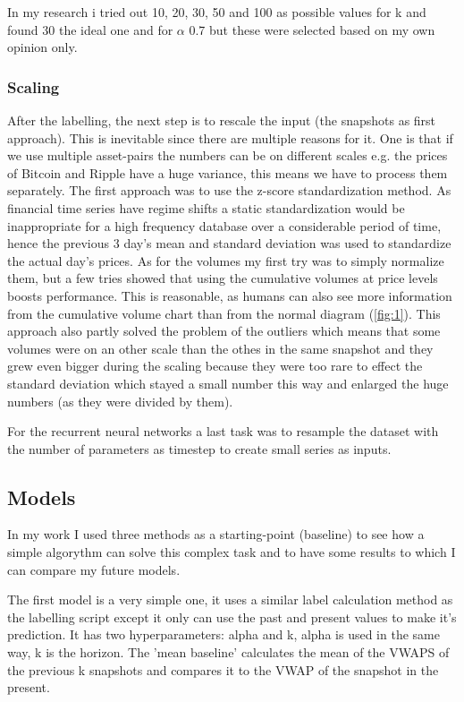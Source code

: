 \documentclass[11pt,a4paper,oneside]{article}
\begin{document}
  In my research i tried out 10, 20, 30, 50 and 100 as possible values for k and found 30 the ideal one and for 
  $\alpha$ 0.7 but these were selected based on my own opinion only.

  \subsubsection{Scaling}
  \label{scaling}

  After the labelling, the next step is to rescale the input (the snapshots as first approach). This is inevitable since 
  there are multiple reasons for it. One is that if we use multiple asset-pairs the numbers can be on different scales 
  e.g. the prices of Bitcoin and Ripple have a huge variance, this means we have to process them separately. The first 
  approach was to use the z-score standardization method. As financial time series have regime shifts a static 
  standardization would be inappropriate for a high frequency database over a considerable period of time, hence the 
  previous 3 day's mean and standard deviation was used to standardize the actual day's prices. As for the volumes my 
  first try was to simply normalize them, but a few tries showed that using the cumulative volumes at price levels 
  boosts performance. This is reasonable, as humans can also see more information from the cumulative volume chart than 
  from the normal diagram (\ref{fig:1}). This approach also partly solved the problem of the outliers which means that 
  some volumes were on an other scale than the othes in the same snapshot and they grew even bigger during the scaling 
  because they were too rare to effect the standard deviation which stayed a small number this way and enlarged the huge 
  numbers (as they were divided by them).

  For the recurrent neural networks a last task was to resample the dataset with the number of parameters as timestep to 
  create small series as inputs.

\subsection{Models}
\label{models}

In my work I used three methods as a starting-point (baseline) to see how a simple algorythm can solve this complex task 
and to have some results to which I can compare my future models. 

The first model is a very simple one, it uses a 
similar label calculation method as the labelling script except it only can use the past and present values to make it's 
prediction. It has two hyperparameters: alpha and k, alpha is used in the same way, k is the horizon. The 'mean baseline' 
calculates the mean of the VWAPS of the previous k snapshots and compares it to the VWAP of the snapshot in the present. 
\end{document}
